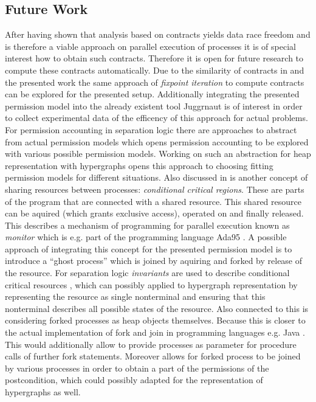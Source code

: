\subsection{Future Work}
\label{sec:futurework}
	After having shown that analysis based on contracts yields data race freedom
	and is therefore a viable approach on parallel execution of processes it is
	of special interest how to obtain such contracts. Therefore it is open for
	future research to compute these contracts automatically. Due to the
	similarity of contracts in \cite{ProcedureSummaries} and the
	presented work the same approach of \emph{fixpoint iteration} to compute
	contracts can be explored for the presented setup. Additionally integrating
	the presented permission model into the already existent tool Juggrnaut is
	of interest in order to collect experimental data of the efficency of this
	approach for actual problems.
	For permission accounting in separation logic there are approaches to
	abstract from actual permission models
	\cites{SeparationLogic}{AbstractSeparationLogic} which opens permission
	accounting to be explored with various possible permission models. Working
	on such an abstraction for heap representation with hypergraphs opens this
	approach to choosing fitting permission models for different situations.
	Also discussed in \cite{SeparationLogic} is another concept of sharing
	resources between processes: \emph{conditional critical regions}. These are
	parts of the program that are connected with a shared resource. This shared
	resource can be aquired (which grants exclusive access), operated on and
	finally released. This describes a mechanism of programming for parallel
	execution known as \emph{monitor} \cite{Monitor} which is e.g. part of the
	programming language Ada95 \cite[p. 163ff]{Ada95}. A possible approach of
	integrating this concept for the presented permission model is to introduce
	a \enquote{ghost process} which is joined by aquiring and forked by
	release of the resource. For separation logic \emph{invariants} are used to
	describe conditional critical resources \cite{SeparationLogic}, which can
	possibly applied to hypergraph representation by representing the resource
	as single nonterminal and ensuring that this nonterminal describes all
	possible states of the resource. Also connected to this is considering
	forked processes as heap objects themselves. Because this is closer to the
	actual implementation of fork and join in programming languages e.g. Java
	\cite{MultithreadedJavaPrograms}. This would additionally allow to provide
	processes as parameter for procedure calls of further fork statements.
	Moreover \cite{MultithreadedJavaPrograms} allows for forked process to be
	joined by various processes in order to obtain a part of the permissions of
	the postcondition, which could possibly adapted for the representation of
	hypergraphs as well.

